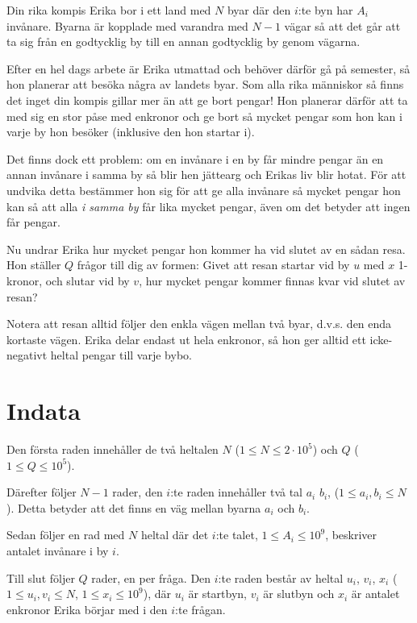 Din rika kompis Erika bor i ett land med $N$ byar där den $i$:te byn har $A_i$ invånare. Byarna är kopplade med varandra med $N-1$ vägar så att det går att ta sig från en godtycklig by till en annan godtycklig by genom vägarna.

Efter en hel dags arbete är Erika utmattad och behöver därför gå på semester, så hon planerar att besöka några av landets byar. Som alla rika människor så finns det inget din kompis gillar mer än att ge bort pengar! Hon planerar därför att ta med sig en stor påse med enkronor och ge bort så mycket pengar som hon kan i varje by hon besöker (inklusive den hon startar i). 

Det finns dock ett problem: om en invånare i en by får mindre pengar än en annan invånare i samma by så blir hen jättearg och Erikas liv blir hotat. För att undvika detta bestämmer hon sig för att ge alla invånare så mycket pengar hon kan så att alla \textit{i samma by} får lika mycket pengar, även om det betyder att ingen får pengar.

Nu undrar Erika hur mycket pengar hon kommer ha vid slutet av en sådan resa. Hon ställer $Q$ frågor till dig av formen: Givet att resan startar vid by $u$ med $x$ 1-kronor, och slutar vid by $v$, hur mycket pengar kommer finnas kvar vid slutet av resan?

Notera att resan alltid följer den enkla vägen mellan två byar, d.v.s. den enda kortaste vägen.
Erika delar endast ut hela enkronor, så hon ger alltid ett icke-negativt heltal pengar till varje bybo.

\section*{Indata}
Den första raden innehåller de två heltalen $N$ ($1\leq N \leq 2 \cdot 10^5$) och $Q$ ($1 \leq Q \leq 10^5$).

Därefter följer $N-1$ rader, den $i$:te raden innehåller två tal $a_i$ $b_i$, ($1 \leq a_i,b_i \leq N$). Detta betyder att det finns en väg mellan byarna $a_i$ och $b_i$.

Sedan följer en rad med $N$ heltal där det $i$:te talet, $1\leq A_i \leq 10^9$, beskriver antalet invånare i by $i$.

Till slut följer $Q$ rader, en per fråga.
Den $i$:te raden består av heltal $u_i$, $v_i$, $x_i$ ($1 \leq u_i,v_i \leq N$, $1 \leq x_i \leq 10^9$), där $u_i$ är startbyn, $v_i$ är slutbyn och $x_i$ är antalet enkronor Erika börjar med i den $i$:te frågan.


